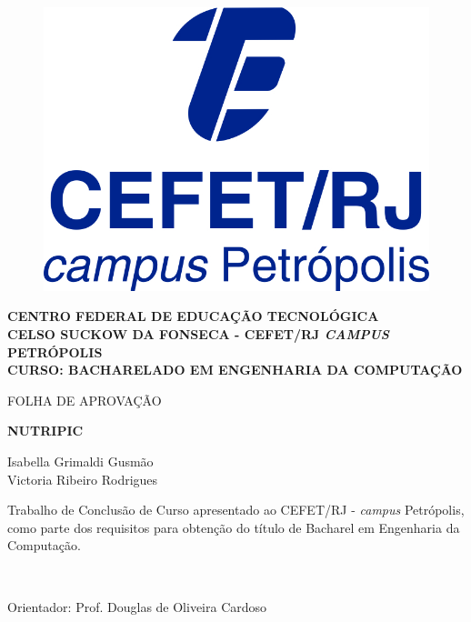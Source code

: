 {\center %


\begin{figure}
\center
\includegraphics[height=0.13\textwidth]{Figs/logoCefetCampusPetropolis.jpg} 
\end{figure}

\begin{center}
{\large \bf CENTRO FEDERAL DE EDUCAÇÃO TECNOLÓGICA} \vspace{1mm} \\
{\large \bf CELSO SUCKOW DA FONSECA - CEFET/RJ \textit{CAMPUS} PETRÓPOLIS} \vspace{1mm} \\
{\large \bf CURSO: BACHARELADO EM ENGENHARIA DA COMPUTAÇÃO}

\vspace*{1.2cm}
{\large  FOLHA DE APROVAÇÃO}

\vspace*{1.3cm}
{\large \bf NUTRIPIC }\\
\end{center}
\vspace{0.5cm}
\hfill
\begin{flushright}
    Isabella Grimaldi Gusmão \\
	Victoria Ribeiro Rodrigues
	\end{flushright}
\vspace*{0.5cm}
\begin{flushright}
	\begin{minipage}{0.5\textwidth}
		{\normalsize
		Trabalho de Conclusão de Curso apresentado ao  
	 CEFET/RJ -{ {\it campus} Petrópolis}, como parte dos requisitos para obtenção do título de Bacharel em Engenharia da Computação.}
	\end{minipage}\\[0.5cm]
\end{flushright}
\vspace{0.5cm}
\hfill
\begin{flushright}
Orientador: Prof. Douglas de Oliveira Cardoso
\end{flushright}

}
